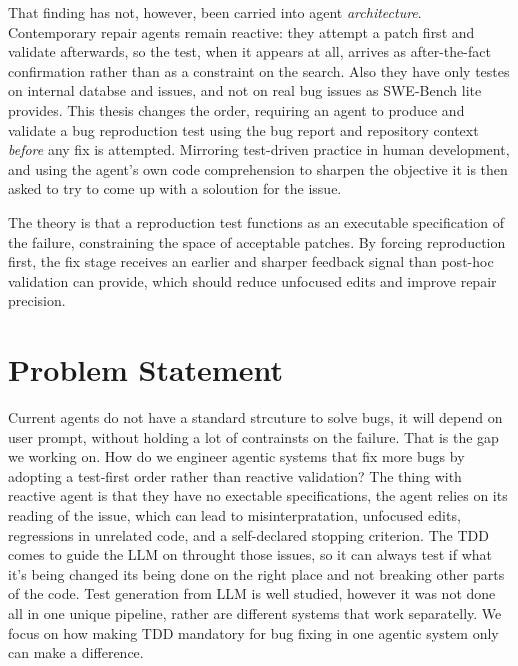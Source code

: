 That finding has not, however, been carried into agent \emph{architecture}.
Contemporary repair agents remain reactive: they attempt a patch first and
validate afterwards, so the test, when it appears at all, arrives as
after-the-fact confirmation rather than as a constraint on the search. Also they have only testes on internal databse and issues, and not on real bug issues as SWE-Bench lite provides. This
thesis changes the order, requiring an agent to produce and validate a bug
reproduction test using the bug report and repository context \emph{before} any
fix is attempted. Mirroring test-driven practice in human development, and
using the agent's own code comprehension to sharpen the objective it is then
asked to try to come up with a soloution for the issue.

The theory is that a reproduction test functions as an executable
specification of the failure, constraining the space of acceptable patches. By
forcing reproduction first, the fix stage receives an earlier and sharper
feedback signal than post-hoc validation can provide, which should reduce
unfocused edits and improve repair precision.

\section{Problem Statement}
\label{sec:intro-problem}
Current agents do not have a standard strcuture to solve bugs, it will depend on user prompt, without holding a lot of contrainsts on the failure. That is the gap we working on. How do we engineer agentic systems that fix more bugs by adopting a test-first order rather than reactive validation? The thing with reactive agent is that they have no exectable specifications, the agent relies on its reading of the issue, which can lead to misinterpratation, unfocused edits, regressions in unrelated code, and a self-declared stopping criterion. The TDD comes to guide the LLM on throught those issues, so it can always test if what it's being changed its being done on the right place and not breaking other parts of the code. Test generation from LLM is well studied, however it was not done all in one unique pipeline, rather are different systems that work separatelly. We focus on how making TDD mandatory for bug fixing in one agentic system only can make a difference.


